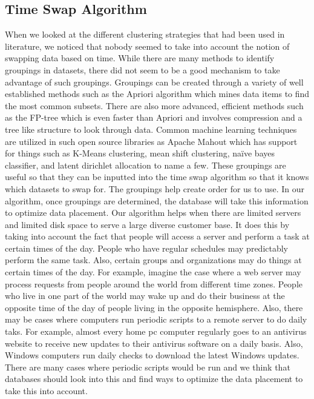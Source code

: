\documentclass[10pt,final,journal]{IEEEtran}
\begin{document}
\subsection {Time Swap Algorithm}
When we looked at the different clustering strategies that had been used in literature, we noticed that nobody seemed to take into account the notion of swapping data based on time. While there are many methods to identify groupings in datasets, there did not seem to be a good mechanism to take advantage of such groupings. Groupings can be created through a variety of well established methods such as the Apriori algorithm which mines data items to find the most common subsets. There are also more advanced, efficient methods such as the FP-tree which is even faster than Apriori and involves compression and a tree like structure to look through data. Common machine learning techniques are utilized in such open source libraries as Apache Mahout which has support for things such as K-Means clustering, mean shift clustering, naïve bayes classifier, and latent dirichlet allocation to name a few. These groupings are useful so that they can be inputted into the time swap algorithm so that it knows which datasets to swap for. The groupings help create order for us to use. In our algorithm, once groupings are determined, the database will take this information to optimize data placement. Our algorithm helps when there are limited servers and limited disk space to serve a large diverse customer base. It does this by taking into account the fact that people will access a server and perform a task at certain times of the day. People who have regular schedules may predictably perform the same task. Also, certain groups and organizations may do things at certain times of the day. For example, imagine the case where a web server may process requests from people around the world from different time zones. People who live in one part of the world may wake up and do their business at the opposite time of the day of people living in the opposite hemisphere. Also, there may be cases where computers run periodic scripts to a remote server to do daily taks.  For example, almost every home pc computer regularly goes to an antivirus website to receive new updates to their antivirus software on a daily basis.  Also, Windows computers run daily checks to download the latest Windows updates. There are many cases where periodic scripts would be run and we think that databases should look into this and find ways to optimize the data placement to take this into account. 
\end{document}
